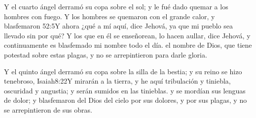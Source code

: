 Y el cuarto ángel derramó su copa sobre el sol; y le fué dado quemar a los hombres con fuego. 
Y los hombres se quemaron con el grande calor, y blasfemaron%
					{52:5}{Y ahora ¿qué a mí aquí, dice Jehová, ya que mi pueblo sea llevado sin por qué? Y los que en él se enseñorean, lo hacen aullar, dice Jehová, y continuamente es blasfemado mi nombre todo el día.}
 el nombre de Dios, que tiene potestad sobre estas plagas, y no se arrepintieron para darle gloria.

Y el quinto ángel derramó su copa sobre la silla de la bestia; y su reino se hizo tenebroso,%
				  {Isaiah}{8:22}{Y mirarán a la tierra, y he aquí tribulación y tiniebla, oscuridad y angustia; y serán sumidos en las tinieblas.}
 y se mordían sus lenguas de dolor; 
y blasfemaron del Dios del cielo%
 por sus dolores, y por sus plagas, y no se arrepintieron de sus obras.

